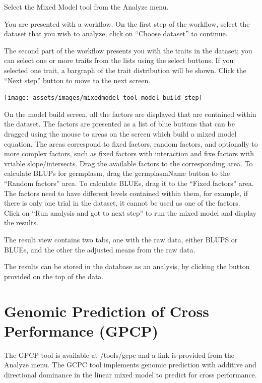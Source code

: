 \documentclass[
  12pt,
]{book}
\begin{document}
Select the Mixed Model tool from the Analyze menu.

You are presented with a workflow. On the first step of the workflow, select the dataset that you wish to analyze, click on ``Choose dataset'' to continue.

The second part of the workflow presents you with the traits in the dataset; you can select one or more traits from the lists using the select buttons. If you selected one trait, a bargraph of the trait distribution will be shown. Click the ``Next step'' button to move to the next screen.

\begin{center}\texttt{[image: assets/images/mixedmodel\_tool\_model\_build\_step]} \end{center}

On the model build screen, all the factors are displayed that are contained within the dataset. The factors are presented as a list of blue buttons that can be dragged using the mouse to areas on the screen which build a mixed model equation. The areas correspond to fixed factors, random factors, and optionally to more complex factors, such as fixed factors with interaction and fixe factors with vriable slope/intersects. Drag the available factors to the corresponding area. To calculate BLUPs for germplasm, drag the germplasmName button to the ``Random factors'' area. To calculate BLUEs, drag it to the ``Fixed factors'' area. The factors need to have different levels contained within them, for example, if there is only one trial in the dataset, it cannot be used as one of the factors. Click on ``Run analysis and got to next step'' to run the mixed model and display the results.

The result view contains two tabs, one with the raw data, either BLUPS or BLUEs, and the other the adjusted means from the raw data.

The results can be stored in the database as an analysis, by clicking the button provided on the top of the data.

\hypertarget{genomic-prediction-of-cross-performance-gpcp}{%
\section{Genomic Prediction of Cross Performance (GPCP)}\label{genomic-prediction-of-cross-performance-gpcp}}

The GPCP tool is available at /tools/gcpc and a link is provided from the Analyze menu. The GCPC tool implements genomic prediction with additive and directional dominance in the linear mixed model to predict for cross performance.
\end{document}
